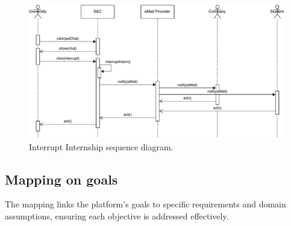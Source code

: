 \begin{figure}[H]
    \begin{center}
        \includegraphics[width=\linewidth]{Images/SequenceDiagram/InterruptInternSD.pdf}
        \caption{Interrupt Internship sequence diagram.}
        \label{fig:interrupt_intern_seqdiag}%
    \end{center}
\end{figure}

\newpage


\subsection{Mapping on goals}
\label{subsec:mapping_on_goals}%

The mapping links the platform's goals to specific
requirements and domain assumptions, ensuring each objective is
addressed effectively.


